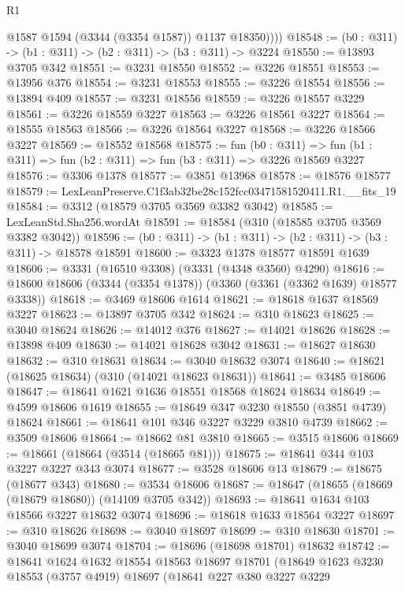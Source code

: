 \begin{lexlean}{R1}
\begin{coremodule}
            @1587
            @1594
            (@3344 (@3354 @1587))
            @1137
            @18350))))
@18548 := (b0 : @311) -> (b1 : @311) -> (b2 : @311) -> (b3 : @311) -> @3224
@18550 := @13893 @3705 @342
@18551 := @3231 @18550
@18552 := @3226 @18551
@18553 := @13956 @376
@18554 := @3231 @18553
@18555 := @3226 @18554
@18556 := @13894 @409
@18557 := @3231 @18556
@18559 := @3226 @18557 @3229
@18561 := @3226 @18559 @3227
@18563 := @3226 @18561 @3227
@18564 := @18555 @18563
@18566 := @3226 @18564 @3227
@18568 := @3226 @18566 @3227
@18569 := @18552 @18568
@18575 := fun (b0 : @311) =>
  fun (b1 : @311) => fun (b2 : @311) => fun (b3 : @311) => @3226 @18569 @3227
@18576 := @3306 @1378
@18577 := @3851 @13968
@18578 := @18576 @18577
@18579 := LexLeanPreserve.C1f3ab32be28c152fcc03471581520411.R1.__fits_19
@18584 := @3312 (@18579 @3705 @3569 @3382 @3042)
@18585 := LexLeanStd.Sha256.wordAt
@18591 := @18584 (@310 (@18585 @3705 @3569 @3382 @3042))
@18596 := (b0 : @311) -> (b1 : @311) -> (b2 : @311) -> (b3 : @311) -> @18578 @18591
@18600 := @3323 @1378 @18577 @18591 @1639
@18606 := @3331 (@16510 @3308) (@3331 (@4348 @3560) @4290)
@18616 := @18600 @18606 (@3344 (@3354 @1378)) (@3360 (@3361 (@3362 @1639) @18577 @3338))
@18618 := @3469 @18606 @1614
@18621 := @18618 @1637 @18569 @3227
@18623 := @13897 @3705 @342
@18624 := @310 @18623
@18625 := @3040 @18624
@18626 := @14012 @376
@18627 := @14021 @18626
@18628 := @13898 @409
@18630 := @14021 @18628 @3042
@18631 := @18627 @18630
@18632 := @310 @18631
@18634 := @3040 @18632 @3074
@18640 := @18621 (@18625 @18634) (@310 (@14021 @18623 @18631))
@18641 := @3485 @18606
@18647 := @18641 @1621 @1636 @18551 @18568 @18624 @18634
@18649 := @4599 @18606 @1619
@18655 := @18649 @347 @3230 @18550 (@3851 @4739) @18624
@18661 := @18641 @101 @346 @3227 @3229 @3810 @4739
@18662 := @3509 @18606
@18664 := @18662 @81 @3810
@18665 := @3515 @18606
@18669 := @18661 (@18664 (@3514 (@18665 @81)))
@18675 := @18641 @344 @103 @3227 @3227 @343 @3074
@18677 := @3528 @18606 @13
@18679 := @18675 (@18677 @343)
@18680 := @3534 @18606
@18687 := @18647 (@18655 (@18669 (@18679 @18680)) (@14109 @3705 @342))
@18693 := @18641 @1634 @103 @18566 @3227 @18632 @3074
@18696 := @18618 @1633 @18564 @3227
@18697 := @310 @18626
@18698 := @3040 @18697
@18699 := @310 @18630
@18701 := @3040 @18699 @3074
@18704 := @18696 (@18698 @18701) @18632
@18742 := @18641
    @1624
    @1632
    @18554
    @18563
    @18697
    @18701
    (@18649
      @1623
      @3230
      @18553
      (@3757 @4919)
      @18697
      (@18641
        @227
        @380
        @3227
        @3229

\end{coremodule}
\end{lexlean}
